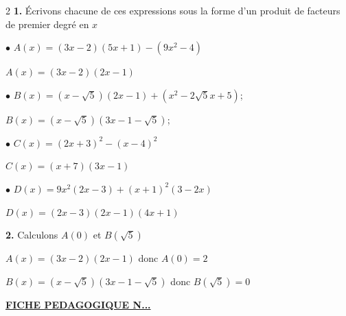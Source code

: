 \begin{multicols*}{2}
  	\dure 
  	\resul
  	\textbf{1.} Écrivons chacune de ces expressions sous la forme d'un produit de facteurs de premier degré en $x$
  	
  	$\bullet$ $A(x)=(3x-2)(5x+1)-(9x^2-4)$
  	
  	$A(x)=(3x-2)(2x-1)$
  	
  	$\bullet$ $B(x)=(x-\sqrt{5})(2x-1)+(x^2-2\sqrt{5}x+5)$;
  	
  	$B(x)=(x-\sqrt{5})(3x-1-\sqrt{5})$;
  	
  	$\bullet$ $C(x)= (2x+3)^2-(x-4)^2$
  	
  	$C(x)= (x+7)(3x-1)$
  	
  	
  	$\bullet$  $D(x)= 9x^2(2x-3)+(x+1)^2(3-2x)$
  	
  	$D(x)= (2x-3)(2x-1)(4x+1)$
  	
  	\textbf{2.} Calculons $A(0)$ et $B(\sqrt{5})$ 
  	
  	$A(x)=(3x-2)(2x-1)$ donc $A(0)=2$ 
  	
  	$B(x)=(x-\sqrt{5})(3x-1-\sqrt{5})$ donc $B(\sqrt{5})=0$
  	
  \end{multicols*}
    \newpage
  \begin{center}
  	\underline{\textbf{\Large FICHE PEDAGOGIQUE N...}}
  \end{center}
